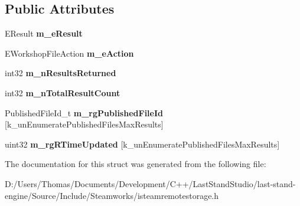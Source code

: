 \subsection*{Public Attributes}
\begin{DoxyCompactItemize}
\item 
\hypertarget{structRemoteStorageEnumeratePublishedFilesByUserActionResult__t_abc80dd96ef0e5b9b6bb42d31c74cda31}{}E\+Result {\bfseries m\+\_\+e\+Result}\label{structRemoteStorageEnumeratePublishedFilesByUserActionResult__t_abc80dd96ef0e5b9b6bb42d31c74cda31}

\item 
\hypertarget{structRemoteStorageEnumeratePublishedFilesByUserActionResult__t_ac8e52248508103b9644b370865410a08}{}E\+Workshop\+File\+Action {\bfseries m\+\_\+e\+Action}\label{structRemoteStorageEnumeratePublishedFilesByUserActionResult__t_ac8e52248508103b9644b370865410a08}

\item 
\hypertarget{structRemoteStorageEnumeratePublishedFilesByUserActionResult__t_a818924d03ce6dea407db121b3d2d23f4}{}int32 {\bfseries m\+\_\+n\+Results\+Returned}\label{structRemoteStorageEnumeratePublishedFilesByUserActionResult__t_a818924d03ce6dea407db121b3d2d23f4}

\item 
\hypertarget{structRemoteStorageEnumeratePublishedFilesByUserActionResult__t_ae57a4dd31cbe6dc576dfd1bcfd5e4ceb}{}int32 {\bfseries m\+\_\+n\+Total\+Result\+Count}\label{structRemoteStorageEnumeratePublishedFilesByUserActionResult__t_ae57a4dd31cbe6dc576dfd1bcfd5e4ceb}

\item 
\hypertarget{structRemoteStorageEnumeratePublishedFilesByUserActionResult__t_a2577445d49de549883e331fcb5800261}{}Published\+File\+Id\+\_\+t {\bfseries m\+\_\+rg\+Published\+File\+Id} \mbox{[}k\+\_\+un\+Enumerate\+Published\+Files\+Max\+Results\mbox{]}\label{structRemoteStorageEnumeratePublishedFilesByUserActionResult__t_a2577445d49de549883e331fcb5800261}

\item 
\hypertarget{structRemoteStorageEnumeratePublishedFilesByUserActionResult__t_a0d888a1386c0f3c5349b64a3cc267766}{}uint32 {\bfseries m\+\_\+rg\+R\+Time\+Updated} \mbox{[}k\+\_\+un\+Enumerate\+Published\+Files\+Max\+Results\mbox{]}\label{structRemoteStorageEnumeratePublishedFilesByUserActionResult__t_a0d888a1386c0f3c5349b64a3cc267766}

\end{DoxyCompactItemize}


The documentation for this struct was generated from the following file\+:\begin{DoxyCompactItemize}
\item 
D\+:/\+Users/\+Thomas/\+Documents/\+Development/\+C++/\+Last\+Stand\+Studio/last-\/stand-\/engine/\+Source/\+Include/\+Steamworks/isteamremotestorage.\+h\end{DoxyCompactItemize}
